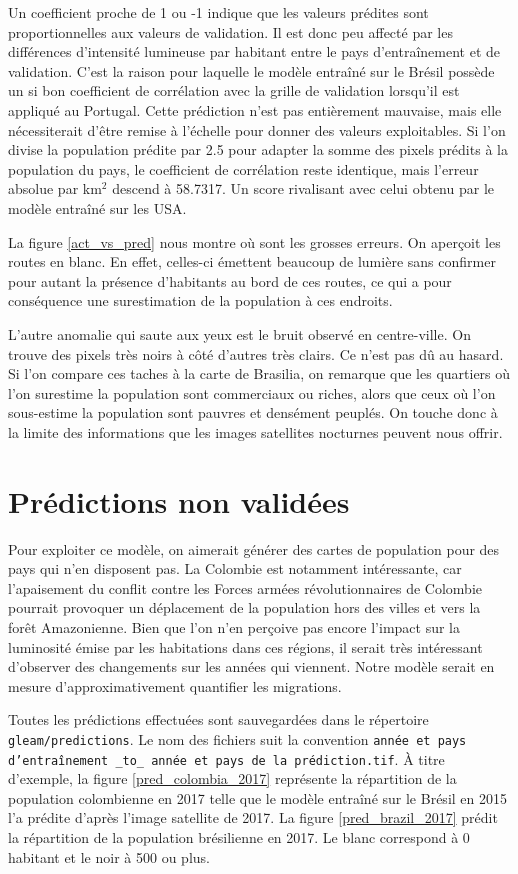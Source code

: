 \documentclass[a4paper, 11pt]{report}
\begin{document}
Un coefficient proche de 1 ou -1 indique que les valeurs prédites sont proportionnelles aux valeurs de validation. Il est donc peu affecté par les différences d'intensité lumineuse par habitant entre le pays d'entraînement et de validation. C'est la raison pour laquelle le modèle entraîné sur le Brésil possède un si bon coefficient de corrélation avec la grille de validation lorsqu'il est appliqué au Portugal. Cette prédiction n'est pas entièrement mauvaise, mais elle nécessiterait d'être remise à l'échelle pour donner des valeurs exploitables. Si l'on divise la population prédite par 2.5 pour adapter la somme des pixels prédits à la population du pays, le coefficient de corrélation reste identique, mais l'erreur absolue par km$^2$ descend à 58.7317. Un score rivalisant avec celui obtenu par le modèle entraîné sur les USA.

La figure \ref{act_vs_pred} nous montre où sont les grosses erreurs. On aperçoit les routes en blanc. En effet, celles-ci émettent beaucoup de lumière sans confirmer pour autant la présence d'habitants au bord de ces routes, ce qui a pour conséquence une surestimation de la population à ces endroits.

L'autre anomalie qui saute aux yeux est le bruit observé en centre-ville. On trouve des pixels très noirs à côté d'autres très clairs. Ce n'est pas dû au hasard. Si l'on compare ces taches à la carte de Brasilia, on remarque que les quartiers où l'on surestime la population sont commerciaux ou riches, alors que ceux où l'on sous-estime la population sont pauvres et densément peuplés. On touche donc à la limite des informations que les images satellites nocturnes peuvent nous offrir.

\section{Prédictions non validées}
Pour exploiter ce modèle, on aimerait générer des cartes de population pour des pays qui n'en disposent pas. La Colombie est notamment intéressante, car l'apaisement du conflit contre les Forces armées révolutionnaires de Colombie pourrait provoquer un déplacement de la population hors des villes et vers la forêt Amazonienne. Bien que l'on n'en perçoive pas encore l'impact sur la luminosité émise par les habitations dans ces régions, il serait très intéressant d'observer des changements sur les années qui viennent. Notre modèle serait en mesure d'approximativement quantifier les migrations.

Toutes les prédictions effectuées sont sauvegardées dans le répertoire \texttt{gleam/predictions}. Le nom des fichiers suit la convention \texttt{année et pays d'entraînement \_to\_ année et pays de la prédiction.tif}. À titre d'exemple, la figure \ref{pred_colombia_2017} représente la répartition de la population colombienne en 2017 telle que le modèle entraîné sur le Brésil en 2015 l'a prédite d'après l'image satellite de 2017. La figure \ref{pred_brazil_2017} prédit la répartition de la population brésilienne en 2017. Le blanc correspond à 0 habitant et le noir à 500 ou plus.
\end{document}
